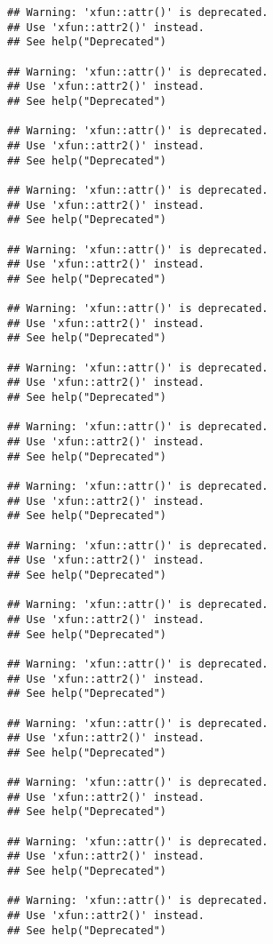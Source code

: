 \documentclass[
]{article}
\begin{document}
\begin{verbatim}
## Warning: 'xfun::attr()' is deprecated.
## Use 'xfun::attr2()' instead.
## See help("Deprecated")

## Warning: 'xfun::attr()' is deprecated.
## Use 'xfun::attr2()' instead.
## See help("Deprecated")

## Warning: 'xfun::attr()' is deprecated.
## Use 'xfun::attr2()' instead.
## See help("Deprecated")

## Warning: 'xfun::attr()' is deprecated.
## Use 'xfun::attr2()' instead.
## See help("Deprecated")

## Warning: 'xfun::attr()' is deprecated.
## Use 'xfun::attr2()' instead.
## See help("Deprecated")

## Warning: 'xfun::attr()' is deprecated.
## Use 'xfun::attr2()' instead.
## See help("Deprecated")

## Warning: 'xfun::attr()' is deprecated.
## Use 'xfun::attr2()' instead.
## See help("Deprecated")

## Warning: 'xfun::attr()' is deprecated.
## Use 'xfun::attr2()' instead.
## See help("Deprecated")

## Warning: 'xfun::attr()' is deprecated.
## Use 'xfun::attr2()' instead.
## See help("Deprecated")

## Warning: 'xfun::attr()' is deprecated.
## Use 'xfun::attr2()' instead.
## See help("Deprecated")

## Warning: 'xfun::attr()' is deprecated.
## Use 'xfun::attr2()' instead.
## See help("Deprecated")

## Warning: 'xfun::attr()' is deprecated.
## Use 'xfun::attr2()' instead.
## See help("Deprecated")

## Warning: 'xfun::attr()' is deprecated.
## Use 'xfun::attr2()' instead.
## See help("Deprecated")

## Warning: 'xfun::attr()' is deprecated.
## Use 'xfun::attr2()' instead.
## See help("Deprecated")

## Warning: 'xfun::attr()' is deprecated.
## Use 'xfun::attr2()' instead.
## See help("Deprecated")

## Warning: 'xfun::attr()' is deprecated.
## Use 'xfun::attr2()' instead.
## See help("Deprecated")
\end{verbatim}
\end{document}
